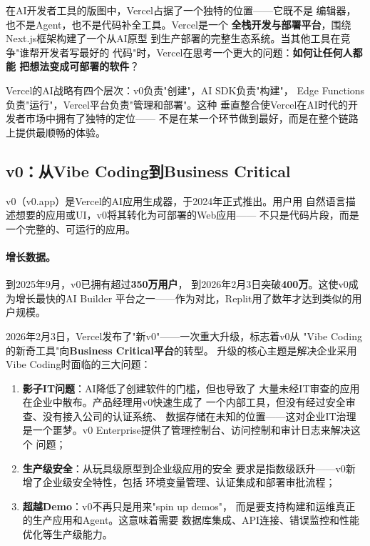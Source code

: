 在AI开发者工具的版图中，Vercel占据了一个独特的位置——它既不是
编辑器，也不是Agent，也不是代码补全工具。Vercel是一个
\textbf{全栈开发与部署平台}，围绕Next.js框架构建了一个从AI原型
到生产部署的完整生态系统。当其他工具在竞争"谁帮开发者写最好的
代码"时，Vercel在思考一个更大的问题：\textbf{如何让任何人都能
把想法变成可部署的软件}？

Vercel的AI战略有四个层次：v0负责"创建"，AI SDK负责"构建"，
Edge Functions负责"运行"，Vercel平台负责"管理和部署"。这种
垂直整合使Vercel在AI时代的开发者市场中拥有了独特的定位——
不是在某一个环节做到最好，而是在整个链路上提供最顺畅的体验。

\subsection{v0：从Vibe Coding到Business Critical}
\label{subsec:v0}

v0（v0.app）是Vercel的AI应用生成器，于2024年正式推出。用户用
自然语言描述想要的应用或UI，v0将其转化为可部署的Web应用——
不只是代码片段，而是一个完整的、可运行的应用。

\paragraph{增长数据。}到2025年9月，v0已拥有超过\textbf{350万用户}，
到2026年2月3日突破\textbf{400万}。这使v0成为增长最快的AI Builder
平台之一——作为对比，Replit用了数年才达到类似的用户规模。

2026年2月3日，Vercel发布了"新v0"——一次重大升级，标志着v0从
"Vibe Coding的新奇工具"向\textbf{Business Critical平台}的转型。
升级的核心主题是解决企业采用Vibe Coding时面临的三大问题：

\begin{enumerate}
  \item \textbf{影子IT问题}：AI降低了创建软件的门槛，但也导致了
    大量未经IT审查的应用在企业中散布。产品经理用v0快速生成了
    一个内部工具，但没有经过安全审查、没有接入公司的认证系统、
    数据存储在未知的位置——这对企业IT治理是一个噩梦。v0
    Enterprise提供了管理控制台、访问控制和审计日志来解决这个
    问题；
  \item \textbf{生产级安全}：从玩具级原型到企业级应用的安全
    要求是指数级跃升——v0新增了企业级安全特性，包括
    环境变量管理、认证集成和部署审批流程；
  \item \textbf{超越Demo}：v0不再只是用来"spin up demos"，
    而是要支持构建和运维真正的生产应用和Agent。这意味着需要
    数据库集成、API连接、错误监控和性能优化等生产级能力。
\end{enumerate}


